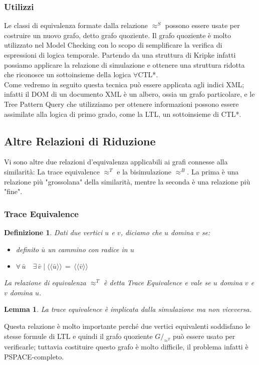 \documentclass[12pt,a4paper,openright,twoside]{report}
\newtheorem{definition}{Definizione}
\newtheorem{lemma}{Lemma}
\theoremstyle{definition}
\begin{document}
\subsubsection{Utilizzi}
Le classi di equivalenza formate dalla relazione $\approx^S$ possono essere usate per costruire un nuovo grafo, detto grafo quoziente. Il grafo quoziente è molto utilizzato nel Model Checking con lo scopo di semplificare la verifica di espressioni di logica temporale. Partendo da una struttura di Kripke infatti possiamo applicare la relazione di simulazione e ottenere una struttura ridotta che riconosce un sottoinsieme della logica $\forall$CTL*.\\
Come vedremo in seguito questa tecnica può essere applicata agli indici XML; infatti il DOM di un documento XML è un albero, ossia un grafo particolare, e le Tree Pattern Query che utilizziamo per ottenere informazioni possono essere assimilate alla logica di primo grado, come la LTL, un sottoinsieme di CTL*.
\subsection{Altre Relazioni di Riduzione}
Vi sono altre due relazioni d'equivalenza applicabili ai grafi connesse alla similarità: La trace equivalence $\approx^T$ e la bisimulazione $\approx^B$. La prima è una relazione più "grossolana" della similarità, mentre la seconda è una relazione più "fine".
\subsubsection{Trace Equivalence}
\begin{definition}
Dati due vertici $u$ e $v$, diciamo che $u$ domina $v$ se:
\begin{itemize}
\item definito $\bar{u}$ un cammino con radice in $u$
\item $\forall\,\bar{u}\quad\exists\,\bar{v}\;|\;\langle\langle \bar{u} \rangle\rangle\,=\, \langle\langle \bar{v} \rangle\rangle$
\end{itemize}
La relazione di equivalenza $\approx^T$ è detta Trace Equivalence e vale se $u$ domina $v$ e $v$ domina $u$.
\end{definition}
\begin{lemma}
La trace equivalence è implicata dalla simulazione ma non viceversa.
\end{lemma}
Questa relazione è molto importante perché due vertici equivalenti soddisfano le stesse formule di LTL e quindi il grafo quoziente $G/_{\approx^T}$ può essere usato per verificarle; tuttavia costituire questo grafo è molto difficile, il problema infatti è PSPACE-completo.
\end{document}
